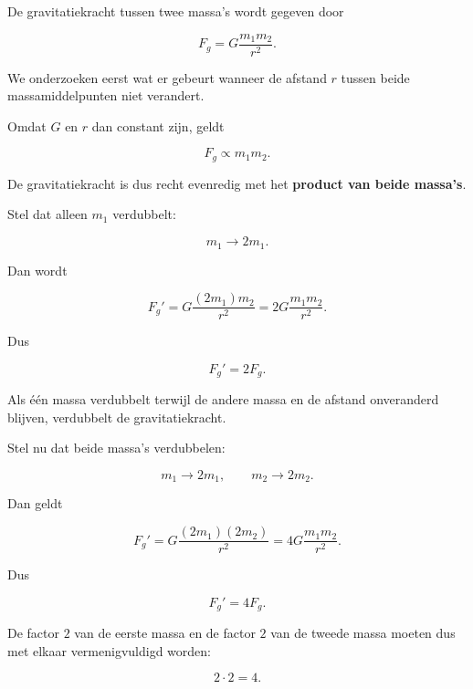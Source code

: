 \documentclass{ximera}
\begin{document}

De gravitatiekracht tussen twee massa's wordt gegeven door

\[
F_g
=
G\frac{m_1m_2}{r^2}.
\]

We onderzoeken eerst wat er gebeurt wanneer de afstand $r$ tussen
beide massamiddelpunten niet verandert.

Omdat $G$ en $r$ dan constant zijn, geldt

\[
\boxed{
F_g\propto m_1m_2.
}
\]

De gravitatiekracht is dus recht evenredig met het
\textbf{product van beide massa's}.



Stel dat alleen $m_1$ verdubbelt:

\[
m_1\longrightarrow 2m_1.
\]

Dan wordt

\[
F_g'
=
G\frac{(2m_1)m_2}{r^2}
=
2G\frac{m_1m_2}{r^2}.
\]

Dus

\[
\boxed{
F_g'=2F_g.
}
\]

Als één massa verdubbelt terwijl de andere massa en de afstand
onveranderd blijven, verdubbelt de gravitatiekracht.



Stel nu dat beide massa's verdubbelen:

\[
m_1\longrightarrow2m_1,
\qquad
m_2\longrightarrow2m_2.
\]

Dan geldt

\[
F_g'
=
G\frac{(2m_1)(2m_2)}{r^2}
=
4G\frac{m_1m_2}{r^2}.
\]

Dus

\[
\boxed{
F_g'=4F_g.
}
\]

De factor $2$ van de eerste massa en de factor $2$ van de tweede
massa moeten dus met elkaar vermenigvuldigd worden:

\[
2\cdot2=4.
\]
\end{document}
